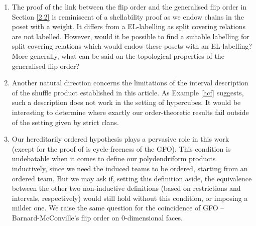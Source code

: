 \documentclass{article}
\theoremstyle{plain}
\theoremstyle{definition}
\begin{document}
\begin{enumerate}
\item The proof of the link between the flip order and the generalised flip order in Section \ref{2.2} is reminiscent of a shellability proof as we endow chains in the poset with a weight. It differs from a EL-labelling as split covering relations are not labelled. However, would it be possible to find a suitable labelling for split covering relations which would endow these posets with an EL-labelling? More generally, what can be said on the topological properties of the generalised flip order?
\item Another natural direction concerns the limitations of the interval description of the shuffle product established in this article. As Example \ref{hcf} suggests, such a description does not work in the setting of hypercubes. It would be interesting to determine where exactly our order-theoretic results fail outside of the setting given by strict clans.
\item Our hereditarily ordered hypothesis plays a pervasive role in this work (except for the proof of is cycle-freeness of the GFO). This condition is undebatable when it comes to define our polydendriform products inductively, since we need the induced teams to be ordered, starting from an ordered team. But we may ask if, setting this definition aside, the equivalence between the other two non-inductive definitions (based on restrictions and intervals, respectively) would still hold without this condition, or imposing a milder one. We raise the same question for the coincidence of GFO -- Barnard-McConville's flip order on 0-dimensional faces.
 \end{enumerate}
\end{document}
